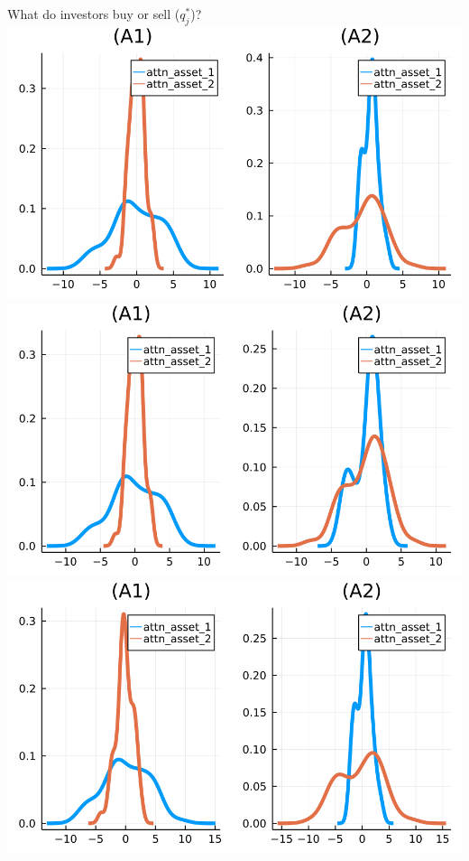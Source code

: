 \documentclass[
  ignorenonframetext,
]{beamer}
\begin{document}
\begin{frame}{What do investors buy or sell (\(q_j^*\))?}
\protect\hypertarget{what-do-investors-buy-or-sell-q_j}{}
\includegraphics[width=0.4\paperwidth]{complexity_files/figure-beamer/unnamed-chunk-19-1}
\includegraphics[width=0.4\paperwidth]{complexity_files/figure-beamer/unnamed-chunk-19-2}
\includegraphics[width=0.4\paperwidth]{complexity_files/figure-beamer/unnamed-chunk-19-3}

\end{frame}
\end{document}
